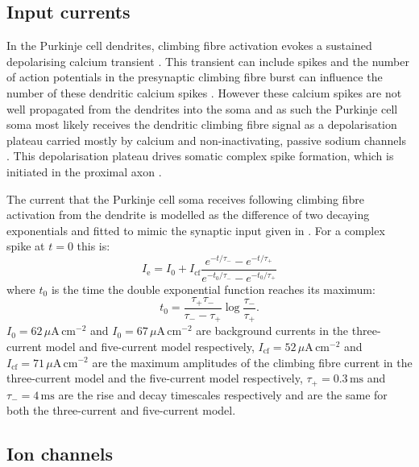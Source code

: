 \documentclass[twocolumn]{svjour3}          %
\newcommand{\mse}{\,\mathrm{ms}}
\newcommand{\cm}{\,\mathrm{cm}}
\begin{document}
\subsection{Input currents}

In the Purkinje cell dendrites, climbing fibre activation evokes a
sustained depolarising calcium transient
\citep{KitamuraHaeusser2011}. This transient can include spikes and the
number of action potentials in the presynaptic climbing fibre burst can influence
the number of these dendritic calcium spikes
\citep{LlinasSugimori1980a,KitamuraHaeusser2011,DavieEtAl2008,MathyEtAl2009}. However
these calcium spikes are not well propagated from the dendrites into
the soma \citep{DavieEtAl2008} and as such the Purkinje cell soma most
likely receives the dendritic climbing fibre signal as a
depolarisation plateau carried mostly by calcium and non-inactivating, passive sodium
channels
\citep{LlinasSugimori1980b,KnopfelEtAl1990,LlinasNicholson1971,StuartHausser1994}. This
depolarisation plateau drives somatic complex spike formation, which
is initiated in the proximal axon \citep{StuartHausser1994,DavieEtAl2008,PalmerEtAl2010}. 

The current that the Purkinje cell soma receives following climbing
fibre activation from the dendrite is modelled as the difference of
two decaying exponentials and fitted to mimic the synaptic input given
in \citet{DavieEtAl2008}. For a complex spike at $t=0$ this is:
\begin{equation}
\label{eq:I_synapse}
I_{\mathrm{e}} = I_0+I_{\mathrm{cf}}\frac{e^{-t/\tau_-}-e^{-t/\tau_+}}{e^{-t_0/\tau_-}-e^{-t_0/\tau_+}}
\end{equation}
where $t_0$ is the time the double exponential function reaches its maximum:
\begin{equation}
t_0 = \frac{\tau_+\tau_-} {\tau_--\tau_+}\log{\frac{\tau_-}{\tau_+}}.
\end{equation}
$I_0=62\,\mu\mathrm{A}\cm^{-2}$ and $I_0=67\,\mu\mathrm{A}\cm^{-2}$
are background currents in the three-current model and five-current
model respectively, $I_{\mathrm{cf}}=52\,\mu\mathrm{A}\cm^{-2}$ and
$I_{\mathrm{cf}}=71\,\mu\mathrm{A}\cm^{-2}$ are the maximum amplitudes
of the climbing fibre current in the three-current model and the
five-current model respectively, $\tau_+=0.3\mse$ and $\tau_-=4\mse$
are the rise and decay timescales respectively and are the same for
both the three-current and five-current model.

\subsection{Ion channels}
\end{document}

